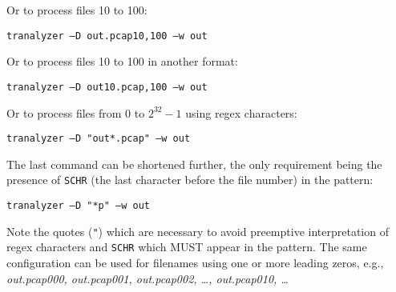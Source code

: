 Or to process files 10 to 100:
\begin{center}
    {\tt tranalyzer --D out.pcap10,100 --w out}
\end{center}

Or to process files 10 to 100 in another format:
\begin{center}
    {\tt tranalyzer --D out10.pcap,100 --w out}
\end{center}

Or to process files from 0 to $2^{32}-1$ using regex characters:
\begin{center}
    {\tt tranalyzer --D "out*.pcap" --w out}
\end{center}

The last command can be shortened further, the only requirement being the presence of {\tt SCHR} (the last character before the file number) in the pattern:
\begin{center}
    {\tt tranalyzer --D "*p" --w out}
\end{center}
Note the quotes ({\tt "}) which are necessary to avoid preemptive interpretation of regex characters and {\tt SCHR} which MUST appear in the pattern. The same configuration can be used for filenames using one or more leading zeros, e.g., {\em out.pcap000, out.pcap001, out.pcap002, \ldots, out.pcap010, \ldots}\\

